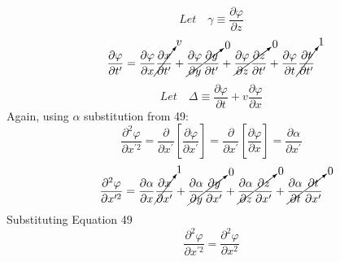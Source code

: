 \documentclass[journal]{IEEEtran}
\begin{document}
\begin{equation}
\boxed{
Let\quad\gamma\equiv\frac{\partial\varphi}{\partial z}
}
\end{equation}
\begin{equation}
\frac{\partial\varphi}{\partial t^{\prime}} =
\frac{\partial\varphi}{\partial x}\cancelto{v}{\frac{\partial x}
{\partial t^\prime}} +
\cancelto{0}{\frac{\partial\varphi}{\partial y}\frac{\partial y}
{\partial t^{\prime}}} +
\cancelto{0}{\frac{\partial\varphi}{\partial z}\frac{\partial z}
{\partial t^{\prime}}} +
\frac{\partial\varphi}{\partial t}\cancelto{1}{\frac{\partial t}
{\partial t^{\prime}}}
\end{equation}
\begin{equation}
\boxed{
Let\quad\Delta\equiv\frac{\partial\varphi}{\partial t} +
v\frac{\partial\varphi}{\partial x}
}
\end{equation}
Again, using \underline{$\alpha$} substitution from 49:
\begin{equation}
\frac{\partial^2\varphi}{\partial x^{\prime 2}}=
\frac{\partial}{\partial x^{\prime}}\left[\frac{\partial\varphi}
{\partial x^{\prime}}\right]=\frac{\partial}{\partial x^{\prime}}
\left[\frac{\partial\varphi}{\partial x}\right]=
\frac{\partial\alpha}{\partial x^{\prime}}
\end{equation}
\begin{equation}
\frac{\partial^2\varphi}{\partial x^{\prime 2}}=
\frac{\partial\alpha}{\partial x}
\cancelto{1}{\frac{\partial x}{\partial x^{\prime}}} +
\cancelto{0}{\frac{\partial\alpha}{\partial y}\frac{\partial y}
{\partial x^{\prime}}}+
\cancelto{0}{\frac{\partial\alpha}{\partial z}\frac{\partial z}
{\partial x^{\prime}}}+
\cancelto{0}{\frac{\partial\alpha}{\partial t}\frac{\partial t}
{\partial x^{\prime}}}
\end{equation}
Substituting Equation 49
\begin{equation}
\boxed{
\frac{\partial^2\varphi}{\partial x^{\prime 2}}=
\frac{\partial^2\varphi}{\partial x^2}
}
\end{equation}
\end{document}
